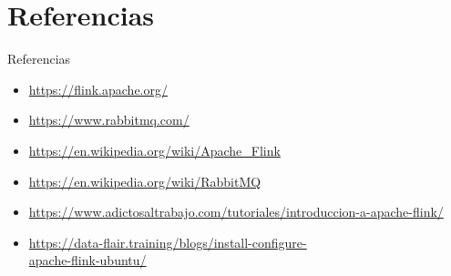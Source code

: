 \documentclass{beamer}
\begin{document}
\section{Referencias}
\begin{frame}{Referencias}
	\begin{itemize}
		\item \url{https://flink.apache.org/}
		\item \url{https://www.rabbitmq.com/}
		\item \url{https://en.wikipedia.org/wiki/Apache_Flink}
		\item \url{https://en.wikipedia.org/wiki/RabbitMQ}
		\item \url{https://www.adictosaltrabajo.com/tutoriales/introduccion-a-apache-flink/}
		\item \url{https://data-flair.training/blogs/install-configure-}\\\url{apache-flink-ubuntu/}
	\end{itemize}
\end{frame}
\end{document}
